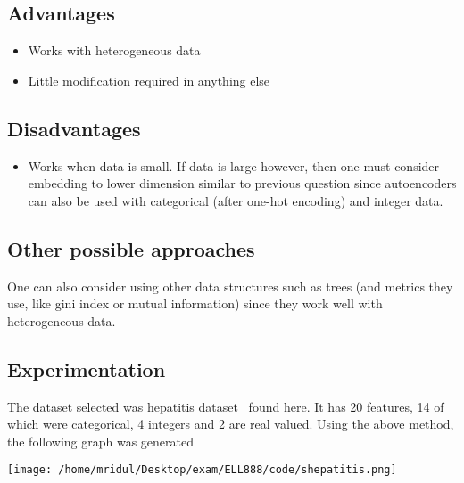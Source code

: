 \documentclass[11pt]{article}
\begin{document}
\subsection{Advantages}
\label{sec:org2f30ab2}
\begin{itemize}
\item Works with heterogeneous data
\item Little modification required in anything else
\end{itemize}
\subsection{Disadvantages}
\label{sec:org12d5ffa}
\begin{itemize}
\item Works when data is small. If data is large however, then one must
consider embedding to lower dimension similar to previous question
since autoencoders can also be used with categorical (after one-hot
encoding) and integer data.
\end{itemize}
\subsection{Other possible approaches}
\label{sec:orgd49153f}
One can also consider using other data structures such as trees (and
metrics they use, like gini index or mutual information) since they
work well with heterogeneous data.
\subsection{Experimentation}
\label{sec:org5cc286a}
The dataset selected was hepatitis dataset~\cite{repo,hep,hep2} found \href{https://archive.ics.uci.edu/ml/datasets/Hepatitis}{here}. It
has 20 features, 14 of which were categorical, 4 integers and 2 are
real valued. Using the above method, the following graph was generated
\begin{center}
\texttt{[image: /home/mridul/Desktop/exam/ELL888/code/shepatitis.png]}
\end{center}


\end{document}
